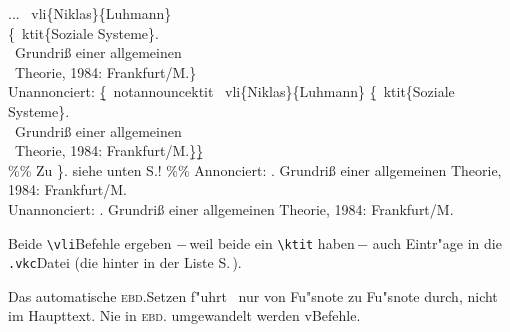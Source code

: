 \documentclass[12pt,a4paper]{article}
\newcommand{\pbs}{\string\ \unskip}
\newcommand{\bs}{\protect\pbs}
\begin{document}
\Doppelbox
{... \bs vli\{Niklas\}\{Luhmann\} 
  \\ \{\bs ktit\{Soziale Systeme\}. 
  \\ \ Grundriß einer allgemeinen 
        \\ \ Theorie, 1984: Frankfurt/M.\}
  \\[1.25ex] 
  Unannonciert:
  \b{\b{\{}}\bs notannouncektit 
    \bs vli\{Niklas\}\{Luhmann\} \b{\{}\bs ktit\{Soziale Systeme\}. 
   \\ \ Grundriß einer allgemeinen 
   \\ \ Theorie, 1984: Frankfurt/M.\b{\}}\b{\b{\}}}
   \\[.75ex] \%\% Zu \}. siehe unten S.\pageref{v-Ausnahme}! \%\%
}
{\vspace{.375ex}
 Annonciert:  {. 
      Grundriß einer allgemeinen Theorie, 1984: Frankfurt/M.}
  \\[4.6ex] Unannonciert:
  {\notannouncektit
    {. 
        Grundriß einer allgemeinen 
        Theorie, 1984: Frankfurt/M.}}
}

\vspace{.5ex}\noindent
Beide \verb|\vli|\hy Befehle ergeben $-$\,weil beide ein \verb|\ktit| haben\,$-$ 
auch Eintr"age in die \hspace{-.175em}\verb|.vkc|\hy Datei \hspace{.1em}(die
\hspace{.05em}{\small\balistnumemph\thepage} \hspace{.05em}hinter 
\hspace{.1em}in der Liste S.\,\pageref{vkc}). 

\vspace{1ex}\noindent
Das automatische \textsc{ebd.}\hy Setzen f"uhrt \BibArts\ nur von 
Fu"snote zu Fu"snote durch, nicht im Haupttext. Nie in \textsc{ebd.} 
\hspace{-.05em}umgewandelt werden v\fhy Befehle.
\end{document}
